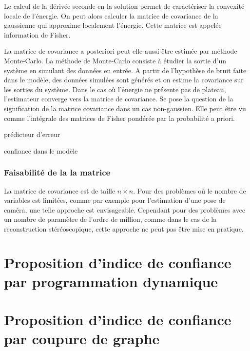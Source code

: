 \documentclass[../main/These_Mathias_Paget.tex]{subfiles}
\begin{document}
Le calcul de la dérivée seconde en la solution permet de caractériser la convexité locale de l’énergie. On peut alors calculer la matrice de covariance de la gaussienne qui approxime localement l’énergie. Cette matrice est appelée information de Fisher.

La matrice de covariance a posteriori peut elle-aussi être estimée par méthode Monte-Carlo. La méthode de Monte-Carlo consiste à étudier la sortie d'un système en simulant des données en entrée. A partir de l'hypothèse de bruit faite dans le modèle, des données simulées sont générés et on estime la covariance sur les sorties du système. Dans le cas où l’énergie ne présente pas de plateau, l'estimateur converge vers la matrice de covariance. Se pose la question de la signification de la matrice covariance dans un cas non-gaussien. Elle peut être vu comme l’intégrale des matrices de Fisher pondérée par la probabilité a priori.

prédicteur d'erreur

confiance dans le modèle

\subsubsection{Faisabilité de la la matrice}

La matrice de covariance est de taille $n \times n$. Pour des problèmes où le nombre de variables est limitées, comme par exemple pour l'estimation d'une pose de caméra, une telle approche est envisageable. Cependant pour des problèmes avec un nombre de paramètre de l'ordre de million, comme dans le cas de la reconstruction stéréoscopique, cette approche ne peut pas être mise en pratique.


\section{Proposition d'indice de confiance par programmation dynamique}
\label{s:indice_DP}

\section{Proposition d'indice de confiance par coupure de graphe}
\label{s:indice_GC}
\end{document}
